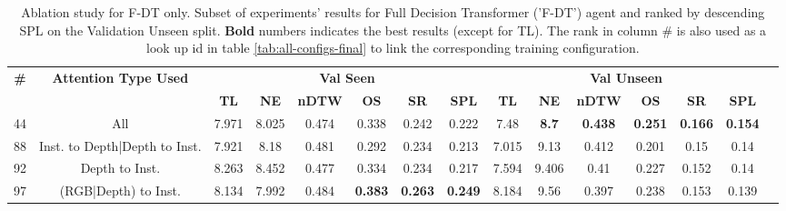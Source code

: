 \begin{table}
\centering
\caption{\label{tab:f_dt_full_dt_ablation}Ablation study for F-DT only. Subset of experiments' results for Full Decision Transformer ('F-DT') agent and ranked by descending SPL on the Validation Unseen split. \textbf{Bold} numbers indicates the best results (except for TL). The rank in column \# is also used as a look up id in table \ref{tab:all-configs-final} to link the corresponding training configuration.}
\begin{tabular}{@{\hskip3pt}c@{\hskip3pt}c@{\hskip3pt}c@{\hskip3pt}c@{\hskip3pt}c@{\hskip3pt}c@{\hskip3pt}c@{\hskip3pt}c@{\hskip3pt}c@{\hskip3pt}c@{\hskip3pt}c@{\hskip3pt}c@{\hskip3pt}c@{\hskip3pt}c@{\hskip3pt}c}
\toprule
                                  \textbf{\#} &   \textbf{Attention Type Used} & \multicolumn{6}{c}{\textbf{Val Seen}} & \multicolumn{6}{c}{\textbf{Val Unseen}} \\
\cmidrule(l){3-8}\cmidrule(l){9-14}\textbf{~} &                     \textbf{~} &       \textbf{TL} &    \textbf{NE} &   \textbf{nDTW} &     \textbf{OS} &     \textbf{SR} &    \textbf{SPL} &         \textbf{TL} &   \textbf{NE} &   \textbf{nDTW} &     \textbf{OS} &     \textbf{SR} &    \textbf{SPL} \\
\midrule
                                           44 &                            All &             7.971 &          8.025 &           0.474 &           0.338 &           0.242 &           0.222 &                7.48 &  \textbf{8.7} &  \textbf{0.438} &  \textbf{0.251} &  \textbf{0.166} &  \textbf{0.154} \\
                                           88 &  Inst. to Depth|Depth to Inst. &             7.921 &           8.18 &           0.481 &           0.292 &           0.234 &           0.213 &               7.015 &          9.13 &           0.412 &           0.201 &            0.15 &            0.14 \\
                                           92 &                 Depth to Inst. &             8.263 &          8.452 &           0.477 &           0.334 &           0.234 &           0.217 &               7.594 &         9.406 &            0.41 &           0.227 &           0.152 &            0.14 \\
                                           97 &           (RGB|Depth) to Inst. &             8.134 &          7.992 &           0.484 &  \textbf{0.383} &  \textbf{0.263} &  \textbf{0.249} &               8.184 &          9.56 &           0.397 &           0.238 &           0.153 &           0.139 \\

\end{tabular}
\end{table}
